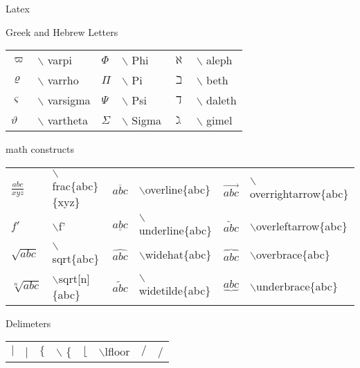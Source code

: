 \begin{section}{Latex}
\begin{subsection}{Greek and Hebrew Letters}
\begin{tabular}{ |m{1cm}m{3cm}|m{1cm}m{3cm}|m{1cm}m{3cm}| }
			$\varpi$ & $\backslash$ varpi &
			$\Phi$ & $\backslash$ Phi &
			$\aleph$ & $\backslash$ aleph \\
	
			$\varrho$ & $\backslash$ varrho &
			$\Pi$ & $\backslash$ Pi &
			$\beth$ & $\backslash$ beth \\
	
			$\varsigma$ & $\backslash$ varsigma &
			$\Psi$ & $\backslash$ Psi &
			$\daleth$ & $\backslash$ daleth \\
	
			$\vartheta$ & $\backslash$ vartheta &
			$\Sigma$ & $\backslash$ Sigma &
			$\gimel$ & $\backslash$ gimel \\
	
	
			\hline
		\end{tabular}	
	\end{subsection}

	\begin{subsection}{math constructs}
		\begin{tabular}{ |m{1cm}|m{3.8cm}|m{1cm}|m{3.8cm}|m{1cm}|m{4.4cm}|  }
		\hline

			$\frac{abc}{xyz}$ & $\backslash$frac\{abc\}\{xyz\} &
			$\overline{abc}$ & $\backslash$overline\{abc\} &
			$\overrightarrow{abc}$ & $\backslash$overrightarrow\{abc\} \\

			$f'$ & $\backslash$f' &
			$\underline{abc}$ & $\backslash$underline\{abc\} &
			$\overleftarrow{abc}$ & $\backslash$overleftarrow\{abc\} \\

			$\sqrt{abc}$ & $\backslash$sqrt\{abc\} &
			$\widehat{abc}$ & $\backslash$widehat\{abc\} &
			$\overbrace{abc}$ & $\backslash$overbrace\{abc\} \\

			$\sqrt[n]{abc}$ & $\backslash$sqrt[n]\{abc\} &
			$\widetilde{abc}$ & $\backslash$widetilde\{abc\} &
			$\underbrace{abc}$ & $\backslash$underbrace\{abc\} \\
		\hline
		\end{tabular}

	
	\end{subsection}

	\begin{subsection}{Delimeters}
		\begin{tabular}{ |m{0.8cm}|m{2.2cm}|m{0.8cm}|m{2.2cm}|m{0.8cm}|m{2.2cm}|m{0.8cm}|m{2.2cm}|  }
		\hline
			$|$ & | &
			$\{$ & $\backslash$ \{ &
			$\lfloor$ & $\backslash$lfloor &
			$/$ & / \\
		

\end{tabular}
\end{subsection}
\end{section}
